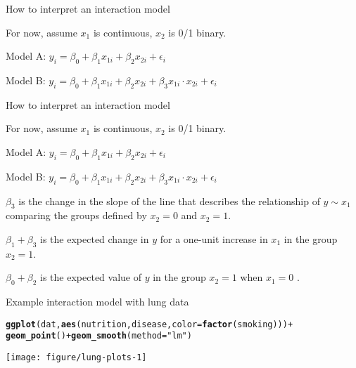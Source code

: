 \documentclass[table]{beamer}\usepackage[]{graphicx}\usepackage[]{color}
\makeatletter
\def\maxwidth{ %
  \ifdim\Gin@nat@width>\linewidth
    \linewidth
  \else
    \Gin@nat@width
  \fi
}
\newcommand{\hlstr}[1]{\textcolor[rgb]{0.192,0.494,0.8}{#1}}%
\newcommand{\hlopt}[1]{\textcolor[rgb]{0,0,0}{#1}}%
\newcommand{\hlstd}[1]{\textcolor[rgb]{0.345,0.345,0.345}{#1}}%
\newcommand{\hlkwc}[1]{\textcolor[rgb]{0.333,0.667,0.333}{#1}}%
\newcommand{\hlkwd}[1]{\textcolor[rgb]{0.737,0.353,0.396}{\textbf{#1}}}%
\newenvironment{kframe}{%
 \def\at@end@of@kframe{}%
 \ifinner\ifhmode%
  \def\at@end@of@kframe{\end{minipage}}%
  \begin{minipage}{\columnwidth}%
 \fi\fi%
 \def\FrameCommand##1{\hskip\@totalleftmargin \hskip-\fboxsep
 \colorbox{shadecolor}{##1}\hskip-\fboxsep
     \hskip-\linewidth \hskip-\@totalleftmargin \hskip\columnwidth}%
 \MakeFramed {\advance\hsize-\width
   \@totalleftmargin\z@ \linewidth\hsize
   \@setminipage}}%
 {\par\unskip\endMakeFramed%
 \at@end@of@kframe}
\newenvironment{knitrout}{}{} %
\makeatother
\begin{document}

\begin{frame}{How to interpret an interaction model}

For now, assume $x_1$ is continuous, $x_2$ is 0/1 binary.

Model A: $ y_i = \beta_0 + \beta_1 x_{1i} + \beta_2 x_{2i} + \epsilon_i$

Model B: $ y_i = \beta_0 + \beta_1 x_{1i} + \beta_2 x_{2i} + \beta_3 x_{1i}\cdot x_{2i} + \epsilon_i$

\vspace{12em}

\end{frame}



\begin{frame}{How to interpret an interaction model}

For now, assume $x_1$ is continuous, $x_2$ is 0/1 binary.

Model A: $ y_i = \beta_0 + \beta_1 x_{1i} + \beta_2 x_{2i} + \epsilon_i$

Model B: $ y_i = \beta_0 + \beta_1 x_{1i} + \beta_2 x_{2i} + \beta_3 x_{1i}\cdot x_{2i} + \epsilon_i$

\vspace{1em}

$\beta_3$ is the change in the slope of the line that describes the relationship of $y \sim x_1$ comparing the groups defined by $x_2=0$ and $x_2=1$.

$\beta_1 + \beta_3$ is the expected change in $y$ for a one-unit increase in $x_1$ in the group $x_2=1$.

$\beta_0 + \beta_2$ is the expected value of $y$ in the group $x_2=1$ when $x_1=0$ .


\end{frame}


\begin{frame}[fragile]{Example interaction model with lung data}

\begin{knitrout}\tiny
{}\color{fgcolor}\begin{kframe}
\begin{alltt}
\hlkwd{ggplot}\hlstd{(dat,} \hlkwd{aes}\hlstd{(nutrition, disease,} \hlkwc{color}\hlstd{=}\hlkwd{factor}\hlstd{(smoking)))} \hlopt{+}
    \hlkwd{geom_point}\hlstd{()} \hlopt{+} \hlkwd{geom_smooth}\hlstd{(}\hlkwc{method}\hlstd{=}\hlstr{"lm"}\hlstd{)}
\end{alltt}
\end{kframe}
\texttt{[image: figure/lung-plots-1]} 

\end{knitrout}

\end{frame}
\end{document}
